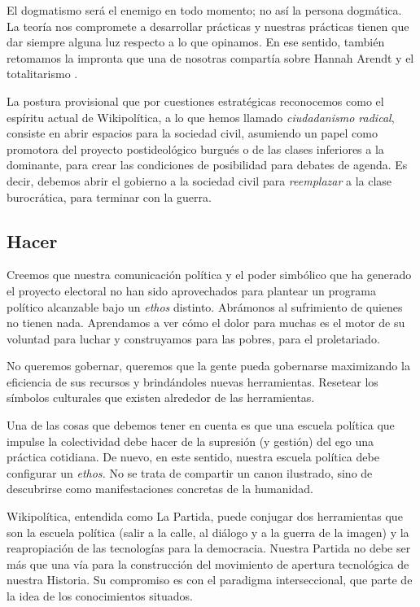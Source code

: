 El dogmatismo será el enemigo en todo momento; no así la persona
dogmática. La teoría nos compromete a desarrollar prácticas y nuestras
prácticas tienen que dar siempre alguna luz respecto a lo que opinamos.
En ese sentido, también retomamos la impronta que una de nosotras
compartía sobre Hannah Arendt y el
totalitarismo \cite{Roiz2002}.

La postura provisional que por cuestiones estratégicas reconocemos como
el espíritu actual de Wikipolítica, a lo que hemos llamado
\emph{ciudadanismo radical}, consiste en abrir espacios para la sociedad
civil, asumiendo un papel como promotora del proyecto postideológico
burgués o de las clases inferiores a la dominante, para crear las
condiciones de posibilidad para debates de agenda. Es decir, debemos
abrir el gobierno a la sociedad civil para \emph{reemplazar} a la clase
burocrática, para terminar con la guerra.

\hypertarget{hacer}{%
\subsection{Hacer}\label{hacer}}

Creemos que nuestra comunicación política y el poder simbólico que ha
generado el proyecto electoral no han sido aprovechados para plantear un
programa político alcanzable bajo un \emph{ethos} distinto. Abrámonos al
sufrimiento de quienes no tienen nada. Aprendamos a ver cómo el dolor
para muchas es el motor de su voluntad para luchar y construyamos para
las pobres, para el proletariado.

No queremos gobernar, queremos que la gente pueda gobernarse maximizando
la eficiencia de sus recursos y brindándoles nuevas herramientas.
Resetear los símbolos culturales que existen alrededor de las
herramientas.

Una de las cosas que debemos tener en cuenta es que una escuela política
que impulse la colectividad debe hacer de la supresión (y gestión) del
ego una práctica cotidiana. De nuevo, en este sentido, nuestra escuela
política debe configurar un \emph{ethos.} No se trata de compartir un
canon ilustrado, sino de descubrirse como manifestaciones concretas de
la humanidad.

Wikipolítica, entendida como La Partida, puede conjugar dos herramientas
que son la escuela política (salir a la calle, al diálogo y a la guerra
de la imagen) y la reapropiación de las tecnologías para la democracia.
Nuestra Partida no debe ser más que una vía para la construcción del
movimiento de apertura tecnológica de nuestra Historia. Su compromiso es
con el paradigma interseccional, que parte de la idea de los
conocimientos situados.\cite{Haraway1988}

